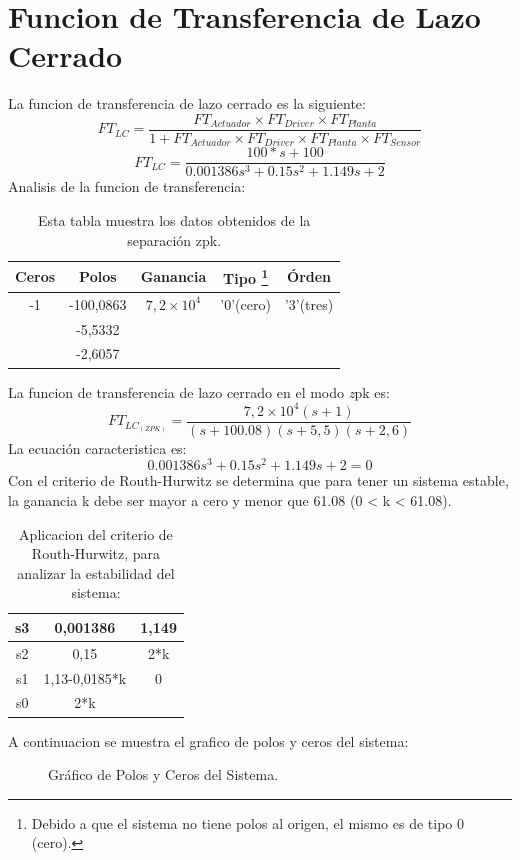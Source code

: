 \documentclass[a4paper,11pt]{article}
\begin{document}
\section{Funcion de Transferencia de Lazo Cerrado}
La funcion de transferencia de lazo cerrado es la siguiente:
$$FT_{LC}=\frac{FT_{Actuador} \times FT_{Driver} \times FT_{Planta}}{1+FT_{Actuador} \times FT_{Driver} \times FT_{Planta} \times FT_{Sensor}} $$
$$FT_{LC}=\frac{100*s+100}{0.001386s^3 + 0.15 s^2 + 1.149 s + 2}$$
Analisis de la funcion de transferencia:
\begin{table}[h!]
\centering
\caption{Esta tabla muestra los datos obtenidos de la separación zpk.}
\begin{tabular}{|ccccc|}
\hline 
 Ceros & Polos & Ganancia & Tipo \footnote{Debido a que el sistema no tiene polos al origen, el mismo es de tipo 0 (cero).} & Órden \tabularnewline
\hline 
\hline 
 -1 & -100,0863 & $7,2\times10^4$ & '0'(cero) & '3'(tres) \tabularnewline
 & -5,5332 & & &\tabularnewline
 & -2,6057 & & &\tabularnewline
\hline 
\end{tabular}
\end{table}
La funcion de transferencia de lazo cerrado en el modo \emph zpk es:
$$FT_{LC_{(ZPK)}}=\frac{7,2\times10^4(s+1)}{(s + 100.08)(s + 5,5)(s + 2,6)}$$
La ecuación caracteristica es:  
$$0.001386s^3 + 0.15 s^2 + 1.149 s + 2=0$$
Con el criterio de Routh-Hurwitz se determina que para tener un sistema estable, la ganancia k debe ser mayor a cero y menor que 61.08 (0 < k < 61.08).\\
\begin{table}[h!]
\centering
\caption{Aplicacion del criterio de Routh-Hurwitz, para analizar la estabilidad del sistema:}
\begin{tabular}{|c|c|c|}
\hline 
s3 & 0,001386 & 1,149\tabularnewline
\hline 
s2 & 0,15 & 2{*}k\tabularnewline
\hline 
s1 & 1,13-0,0185{*}k & 0\tabularnewline
\hline 
s0 & 2{*}k & \tabularnewline
\hline 
\end{tabular}
\end{table}

A continuacion se muestra el grafico de polos y ceros del sistema:\\

  \begin{figure}[H] %
	\caption{Gráfico de Polos y Ceros del Sistema.}
	\label{fig:cp2}
	\end{figure} 
	
\end{document}
